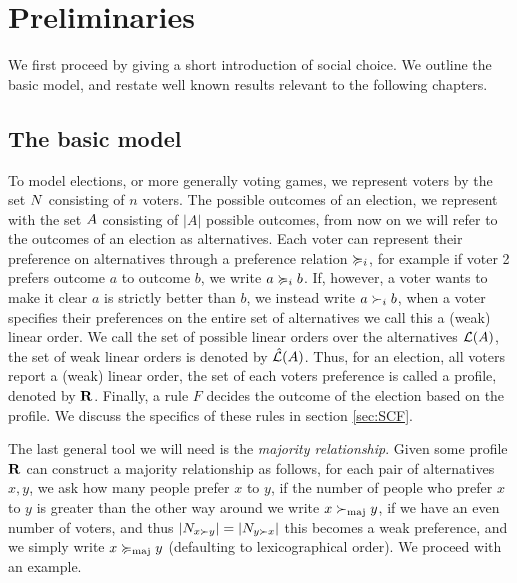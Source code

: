 \chapter{Preliminaries}
We first proceed by giving a short introduction of social choice. We outline the basic model, and restate well known results relevant to the following chapters.

\section{The basic model}
To model elections, or more generally voting games, we represent voters by the set $N$ consisting of $n$ voters. The possible outcomes of an election, we represent with the set $A$ consisting of $|A|$ possible outcomes, from now on we will refer to the outcomes of an election as alternatives. Each voter can represent their preference on alternatives through a preference relation $\succcurlyeq_i$, for example if voter 2 prefers outcome $a$ to outcome $b$, we write $a \succcurlyeq_i b$. If, however, a voter wants to make it clear $a$ is strictly better than $b$, we instead write $a \succ_i b$, when a voter specifies their preferences on the entire set of alternatives we call this a (weak) linear order. We call the set of possible linear orders over the alternatives $\mathcal{L}(A)$, the set of weak linear orders is denoted by $\hat{\mathcal{L}}(A)$. Thus, for an election, all voters report a (weak) linear order, the set of each voters preference is called a profile, denoted by $\mathbf{R}$. Finally, a rule $F$ decides the outcome of the election based on the profile. We discuss the specifics of these rules in section \cref{sec:SCF}.

The last general tool we will need is the \textit{majority relationship}. Given some profile $\mathbf{R}$ can construct a majority relationship as follows, for each pair of alternatives $x,y$, we ask how many people prefer $x$ to $y$, if the number of people who prefer $x$ to $y$ is greater than the other way around we write $x  \succ_{\textnormal{maj}} y$, if we have an even number of voters, and thus $|N_{x \succ y}| = |N_{y \succ x}|$ this becomes a weak preference, and we simply write $x \succcurlyeq_{\textnormal{maj}} y$ (defaulting to lexicographical order). We proceed with an example.

